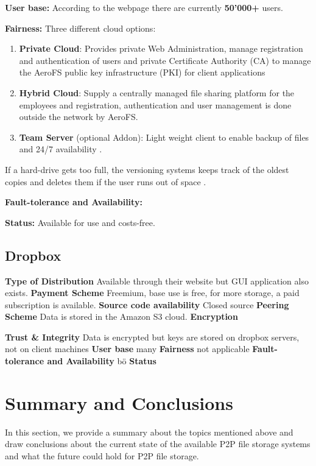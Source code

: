 \textbf{User base:} According to the webpage \cite{aerofs} there are currently \textbf{50'000+} users.

\textbf{Fairness:} Three different cloud options:
\begin{enumerate}
\item \textbf{Private Cloud}: Provides private Web Administration, manage registration and authentication of users and private Certificate Authority (CA) to manage the AeroFS public key infrastructure (PKI) for client applications
\item \textbf{Hybrid Cloud}: Supply a centrally managed file sharing platform for the employees and registration, authentication and user management is done outside the network by AeroFS.
\item \textbf{Team Server} (optional Addon): Light weight client to enable backup of files and 24/7 availability \cite{aerofs:cloud_types}.
\end{enumerate}
If a hard-drive gets too full, the versioning systems keeps track of the oldest copies and deletes them if the user runs out of space \cite{aerofs:USTO.RE}.


\textbf{Fault-tolerance and Availability:} 

\textbf{Status:} Available for use and costs-free.

\subsection{Dropbox}

\textbf{Type of Distribution}
Available through their website but GUI application also exists.
\textbf{Payment Scheme}
Freemium, base use is free, for more storage, a paid subscription is available.
\textbf{Source code availability}
Closed source
\textbf{Peering Scheme}
Data is stored in the Amazon S3 cloud.
\textbf{Encryption}

\textbf{Trust \& Integrity}
Data is encrypted but keys are stored on dropbox servers, not on client machines
\textbf{User base}
many
\textbf{Fairness}
not applicable
\textbf{Fault-tolerance and Availability}
bö
\textbf{Status}

\section{Summary and Conclusions} In this section, we provide a summary about the topics mentioned above and draw conclusions about the current state of the available P2P file storage systems and what the future could hold for P2P file storage.

